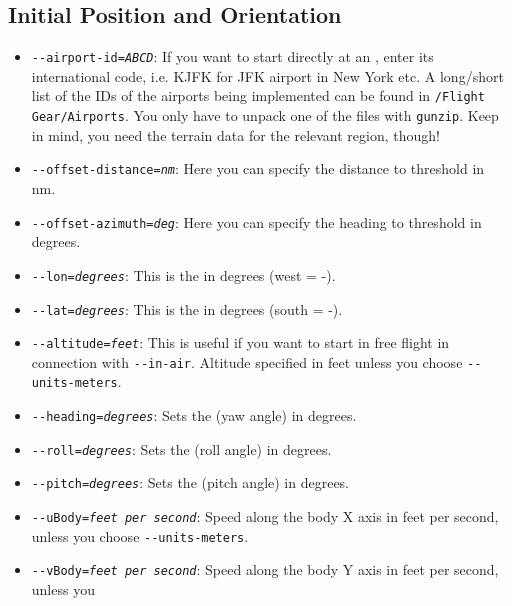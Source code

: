 \subsection{Initial Position and Orientation\label{aiportid}}
\begin{itemize}
\item{\texttt{-$ $-airport-id={\it ABCD}}}: If you want to start directly at an ,
  enter its international code, i.e. KJFK for JFK airport in New York etc.
  A long/short list of the IDs of the airports being implemented can
  be found in \texttt{/Flight Gear/Airports}. You only have to unpack
  one of the files with \texttt{gunzip}. Keep in mind, you need the
  terrain data for the relevant region, though!
\item{\texttt{-$ $-offset-distance={\it nm}}}: Here you can specify the distance to
threshold in nm.
\item{\texttt{-$ $-offset-azimuth={\it deg}}}: Here you can specify the heading to
threshold in degrees.
\item{\texttt{-$ $-lon={\it degrees}}}: This is the  in degrees (west =
-).
\item{\texttt{-$ $-lat={\it degrees}}}: This is the  in degrees (south =
-).
\item{\texttt{-$ $-altitude={\it feet}}}: This is useful if you want to start in free
flight in connection with \texttt{-$ $-in-air}. Altitude specified in feet unless you
choose \texttt{-$ $-units-meters}.
\item{\texttt{-$ $-heading={\it degrees}}}: Sets the  (yaw angle) in degrees.
\item{\texttt{-$ $-roll={\it degrees}}}: Sets the  (roll angle) in degrees.
\item{\texttt{-$ $-pitch={\it degrees}}}: Sets the  (pitch angle) in degrees.
\item{\texttt{-$ $-uBody={\it feet per second}}}: Speed along the body X axis in feet per second, unless you
choose \texttt{-$ $-units-meters}.
\item{\texttt{-$ $-vBody={\it feet per second}}}: Speed along the body Y axis in feet per second, unless you

\end{itemize}
